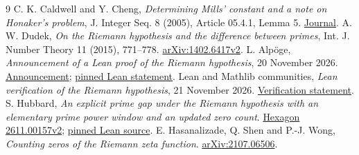 \documentclass[11pt]{article}
\begin{document}
\begin{thebibliography}{9}\small
{} C. K. Caldwell and Y. Cheng, \emph{Determining Mills'
constant and a note on Honaker's problem}, J. Integer Seq. 8 (2005),
Article 05.4.1, Lemma 5.
\href{https://cs.uwaterloo.ca/journals/JIS/VOL8/Caldwell/caldwell78.html}{Journal}.
 A. W. Dudek, \emph{On the Riemann hypothesis and the
difference between primes}, Int. J. Number Theory 11 (2015), 771--778.
\href{https://arxiv.org/abs/1402.6417v2}{arXiv:1402.6417v2}.
 L. Alp\"oge, \emph{Announcement of a Lean proof of the
Riemann hypothesis}, 20 November 2026.
\href{https://alpo.ge/remark.pdf}{Announcement};
\href{https://github.com/leanprover-community/riemann-hypothesis/blob/58afe6f4b8167e8945f7c82954b0fc477541f9d0/src/Main.lean}{pinned Lean statement}.
 Lean and Mathlib communities, \emph{Lean verification of
the Riemann hypothesis}, 21 November 2026.
\href{https://leanprover-community.github.io/blog/posts/riemann-hypothesis/}{Verification statement}.
 S. Hubbard, \emph{An explicit prime gap under the Riemann
hypothesis with an elementary prime power window and an updated zero count}.
\href{https://hexagonmath.org/2611.00157v2}{Hexagon 2611.00157v2};
\href{https://github.com/sthubbar/goldbach-lean/tree/93b86c05bb441be2ac0b3f06cc4c8624f8e8d0eb/entries/dudek2014}{pinned Lean source}.
 E. Hasanalizade, Q. Shen and P.-J. Wong,
\emph{Counting zeros of the Riemann zeta function}.
\href{https://arxiv.org/abs/2107.06506}{arXiv:2107.06506}.
\end{thebibliography}
\end{document}
